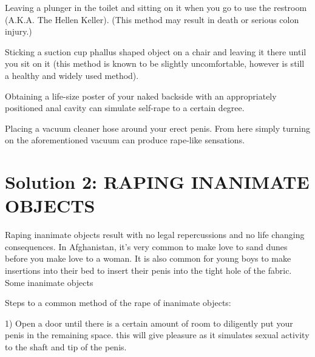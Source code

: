     Leaving a plunger in the toilet and sitting on it when you go to use the 
restroom (A.K.A. The Hellen Keller). (This method may result in death or serious 
colon injury.)


    Sticking a suction cup phallus shaped object on a chair and leaving it there 
until you sit on it (this method is known to be slightly uncomfortable, however 
is still a healthy and widely used method).


    Obtaining a life-size poster of your naked backside with an appropriately 
positioned anal cavity can simulate self-rape to a certain degree.


    Placing a vacuum cleaner hose around your erect penis.  From here simply 
turning on the aforementioned vacuum can produce rape-like sensations.



\section*{Solution 2: RAPING INANIMATE OBJECTS}

Raping inanimate objects result with no legal repercussions and no life changing 
consequences. In Afghanistan, it's very common to make love to sand dunes before 
you make love to a woman. It is also common for young boys to make insertions 
into their bed to insert their penis into the tight hole of the fabric. Some 
inanimate objects


Steps to a common method of the rape of inanimate objects:


1) Open a door until there is a certain amount of room to diligently put your 
penis in the remaining space. this will give pleasure as it simulates sexual 
activity to the shaft and tip of the penis.